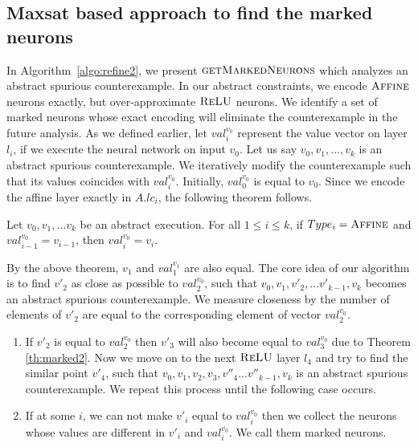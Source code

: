 
\subsection{Maxsat based approach to find the marked neurons}
\label{sec:markedneurons}
In Algorithm~\ref{algo:refine2}, we present $\textsc{getMarkedNeurons}$
which analyzes an abstract spurious counterexample.
In our abstract constraints, we encode $\textsc{Affine}${} neurons exactly, but
over-approximate $\textsc{ReLU}${} neurons.
We identify a set of
marked neurons whose exact encoding will eliminate the counterexample
in the future analysis.
%
%
As we defined earlier, let ${val_i^{{v_0}}}$ represent the value vector
on layer $l_i$, if we execute the neural network on input ${v_0}$.
%
Let us say ${v_0}, {v_1}, ... ,{v_k}$ is an abstract spurious counterexample.
We iteratively modify the counterexample such that its values coincides with ${val_i^{{v_0}}}$.
Initially, ${val_0^{{v_0}}}$ is equal to $v_0$.
Since we encode the affine layer exactly in $A.lc_i$, the following
theorem follows.


\begin{theorem}
  \label{th:marked2}
  Let ${v_0}, {v_1}, ... {v_k}$ be an abstract execution. For all $1\leq i\leq k$, if $Type_i = \textsc{Affine}$ and ${val_{i-1}^{{v_0}}} = {v_{i-1}}$, then ${val_i^{{v_0}}} = {v_i}$.
\end{theorem}

By the above theorem, ${v_1}$ and ${val_1^{v_1}}$ are also equal. 
The core idea of our algorithm is to find ${v'_2}$ as close as possible to ${val_2^{v_0}}$, 
such that ${v_0}, {v_1}, {v'_2}, ... {v'_{k-1}}, {v_k}$ becomes an abstract spurious counterexample. 
We measure closeness by the number of elements of ${v'_2}$ are equal to the 
corresponding element of vector ${val_2^{v_0}}$.
\begin{enumerate}
\item If ${v'_2}$ is equal to ${val_2^{v_0}}$ then ${v'_3}$ will also become 
  equal to ${val_3^{v_0}}$ due to Theorem \ref{th:marked2}. 
  Now we move on to the next $\textsc{ReLU}${} layer $l_4$ and try to find the similar point ${v'_4}$, such that 
  ${v_0}, {v_1}, {v_2}, {v_3},{v''_4}... {v''_{k-1}},{v_k}$ is an abstract spurious counterexample. 
  We repeat this process until the following case occurs. 
\item If at some $i$, we can not make ${v'_i}$ equal to ${val_i^{v_0}}$ then we collect the neurons
  whose values are different in ${v'_i}$ and ${val_i^{v_0}}$. We call them marked neurons.
\end{enumerate}

